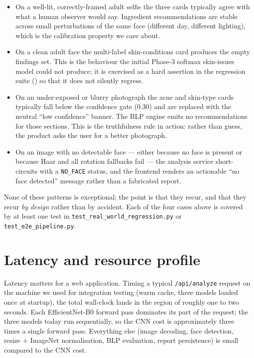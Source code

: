 \documentclass[11pt,a4paper,oneside]{report}
\newcommand{\effnet}{EfficientNet-B0\xspace}
\begin{document}
\begin{itemize}
    \item On a well-lit, correctly-framed adult selfie the three
        cards typically agree with what a human observer would
        say. Ingredient recommendations are stable across small
        perturbations of the same face (different day, different
        lighting), which is the calibration property we care
        about.
    \item On a clean adult face the multi-label skin-conditions
        card produces the empty findings set. This is the
        behaviour the initial Phase-3 softmax skin-issues model
        could not produce; it is exercised as a hard assertion in
        the regression suite () so that it
        does not silently regress.
    \item On an under-exposed or blurry photograph the acne and
        skin-type cards typically fall below the confidence gate
        (0.30) and are replaced with the neutral ``low
        confidence'' banner. The BLP engine emits no
        recommendations for those sections. This is the
        truthfulness rule in action: rather than guess, the
        product asks the user for a better photograph.
    \item On an image with no detectable face --- either because
        no face is present or because Haar and all rotation
        fallbacks fail --- the analysis service short-circuits
        with a \texttt{NO\_FACE} status, and the frontend renders
        an actionable ``no face detected'' message rather than a
        fabricated report.
\end{itemize}

None of these patterns is exceptional; the point is that they
recur, and that they recur \emph{by design} rather than by
accident. Each of the four cases above is covered by at least one
test in \texttt{test\_real\_world\_regression.py} or
\texttt{test\_e2e\_pipeline.py}.

\section{Latency and resource profile}

Latency matters for a web application. Timing a typical
\texttt{/api/analyze} request on the machine we used for
integration testing (warm cache, three models loaded once at
startup), the total wall-clock lands in the region of roughly one
to two seconds. Each \effnet forward pass dominates its part of
the request; the three models today run sequentially, so the CNN
cost is approximately three times a single forward pass.
Everything else (image decoding, face detection, resize + ImageNet
normalisation, BLP evaluation, report persistence) is small
compared to the CNN cost.
\end{document}
